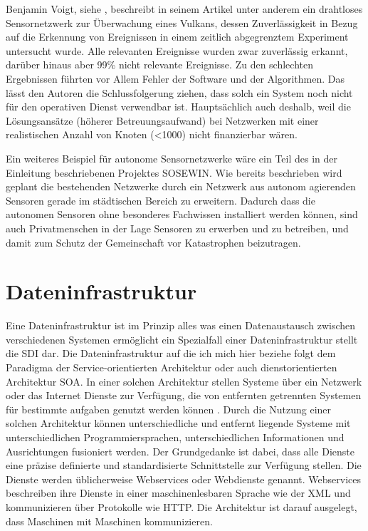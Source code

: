 Benjamin Voigt, siehe \citep{voigt_illustration_2013}, beschreibt in seinem Artikel unter anderem ein drahtloses Sensornetzwerk zur Überwachung eines Vulkans, dessen Zuverlässigkeit in Bezug auf die Erkennung von Ereignissen in einem zeitlich abgegrenztem Experiment untersucht wurde. Alle relevanten Ereignisse wurden zwar zuverlässig erkannt, darüber hinaus aber 99\%  nicht relevante Ereignisse. Zu den schlechten Ergebnissen führten vor Allem Fehler der Software und der Algorithmen. Das lässt den Autoren die Schlussfolgerung ziehen, dass solch ein System noch nicht für den operativen Dienst verwendbar ist. Hauptsächlich auch deshalb, weil die Lösungsansätze (höherer Betreuungsaufwand) bei Netzwerken mit einer realistischen Anzahl von Knoten (<1000) nicht finanzierbar wären.

Ein weiteres Beispiel für autonome Sensornetzwerke wäre ein Teil des in der Einleitung beschriebenen Projektes \gls{SOSEWIN}. Wie bereits beschrieben wird geplant die bestehenden Netzwerke durch ein Netzwerk aus autonom agierenden Sensoren gerade im städtischen Bereich zu erweitern. Dadurch dass die autonomen Sensoren ohne besonderes Fachwissen installiert werden können, sind auch Privatmenschen in der Lage Sensoren zu erwerben und zu betreiben, und damit zum Schutz der Gemeinschaft vor Katastrophen beizutragen.


\section{Dateninfrastruktur}
Eine Dateninfrastruktur ist im Prinzip alles was einen Datenaustausch zwischen verschiedenen Systemen ermöglicht ein Spezialfall einer Dateninfrastruktur stellt die \gls{SDI} dar. Die Dateninfrastruktur auf die ich mich hier beziehe folgt dem Paradigma der Service-orientierten Architektur oder auch dienstorientierten Architektur \gls{SOA}. In einer solchen Architektur stellen Systeme über ein Netzwerk oder das Internet Dienste zur Verfügung, die von entfernten getrennten Systemen für bestimmte aufgaben genutzt werden können \citep{papazoglou_web_2008}. Durch die Nutzung einer solchen Architektur können unterschiedliche und entfernt liegende Systeme mit unterschiedlichen Programmiersprachen, unterschiedlichen Informationen und Ausrichtungen fusioniert werden. Der Grundgedanke ist dabei, dass alle Dienste eine präzise definierte und standardisierte Schnittstelle zur Verfügung stellen. Die Dienste werden üblicherweise Webservices oder Webdienste genannt. Webservices beschreiben ihre Dienste in einer maschinenlesbaren Sprache wie der \gls{XML} und kommunizieren über Protokolle wie \gls{HTTP}. Die Architektur ist darauf ausgelegt, dass Maschinen mit Maschinen kommunizieren.

